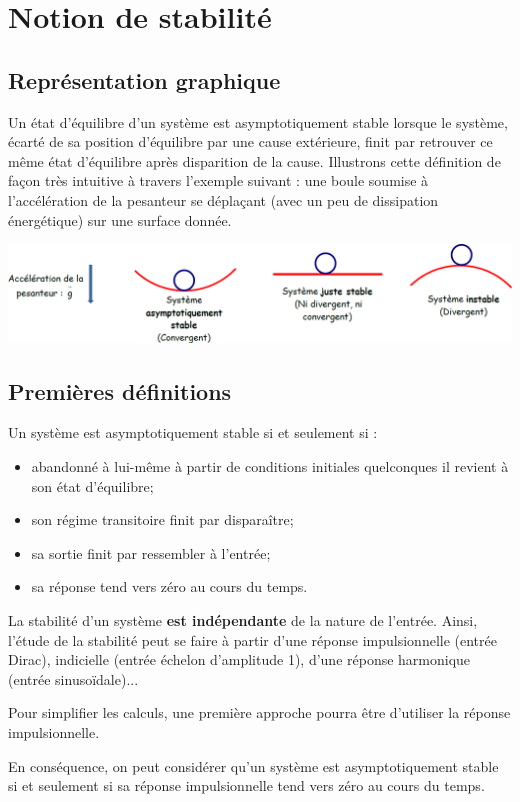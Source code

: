 \documentclass[10pt,fleqn]{article} %
\begin{document}

\setlength{\columnseprule}{.1pt}

\vspace{2cm}
\pagestyle{fancy}
\thispagestyle{plain}
\section{Notion de stabilité}
\subsection{Représentation graphique \cite{1}}
Un état d'équilibre d'un système est asymptotiquement stable lorsque le système, écarté de sa position d'équilibre par une
cause extérieure, finit par retrouver ce même état d'équilibre après disparition de la
cause.
Illustrons cette définition de façon très intuitive à travers l'exemple suivant : une boule
soumise à l'accélération de la pesanteur se déplaçant (avec un peu de dissipation
énergétique) sur une surface donnée.

\begin{center}
\includegraphics[width=.9\linewidth]{images/fig_stabilite}
\end{center}
\subsection{Premières définitions}
\begin{defi}

Un système est asymptotiquement stable si et seulement si : 
\begin{itemize}
\item abandonné à lui-même à partir de conditions initiales quelconques il revient à son état d'équilibre;
\item son régime transitoire finit par disparaître;
\item sa sortie finit par ressembler à l'entrée;
\item sa réponse tend vers zéro au cours du temps.
\end{itemize}

\end{defi}

\begin{rem}
La stabilité d'un système \textbf{est indépendante} de la nature de l'entrée. Ainsi, l'étude de la stabilité peut se faire à partir d'une réponse impulsionnelle (entrée Dirac), indicielle (entrée échelon d'amplitude 1), d'une réponse harmonique (entrée sinusoïdale)...

Pour simplifier les calculs, une première approche pourra être d'utiliser la réponse impulsionnelle. 
\end{rem}
\begin{defi}
En conséquence, on peut considérer qu'un système est asymptotiquement stable si et seulement si sa réponse impulsionnelle tend vers zéro au cours du temps.
\end{defi}
\end{document}
